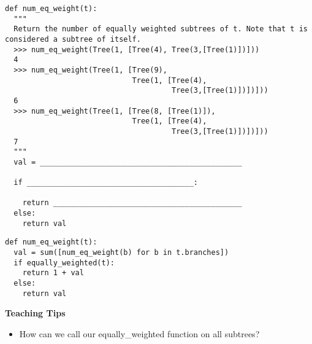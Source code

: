 \begin{parts}
\begin{lstlisting}
def num_eq_weight(t):
  """
  Return the number of equally weighted subtrees of t. Note that t is considered a subtree of itself.
  >>> num_eq_weight(Tree(1, [Tree(4), Tree(3,[Tree(1)])]))
  4
  >>> num_eq_weight(Tree(1, [Tree(9), 
                             Tree(1, [Tree(4), 
                                      Tree(3,[Tree(1)])])]))
  6
  >>> num_eq_weight(Tree(1, [Tree(8, [Tree(1)]), 
                             Tree(1, [Tree(4), 
                                      Tree(3,[Tree(1)])])]))
  7
  """
  val = ______________________________________________

  if ______________________________________:

    return ___________________________________________
  else:
    return val
\end{lstlisting}

\begin{solution}
\begin{lstlisting}
def num_eq_weight(t):
  val = sum([num_eq_weight(b) for b in t.branches])
  if equally_weighted(t):
    return 1 + val
  else:
    return val
\end{lstlisting}
\end{solution}
\begin{guide}
\textbf{Teaching Tips}
  \begin{itemize}
    \item How can we call our equally\_weighted function on all subtrees?
  \end{itemize}
\end{guide}
\end{parts}